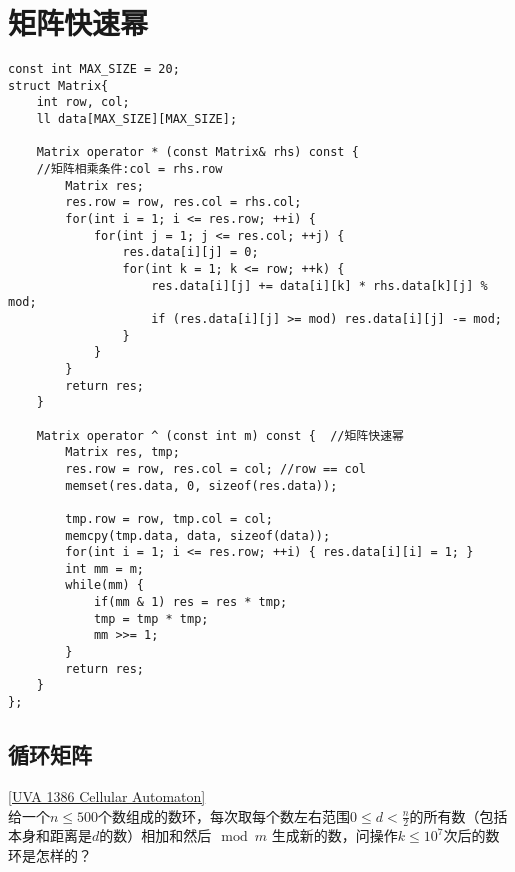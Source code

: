 \section{矩阵快速幂}
\begin{lstlisting}
const int MAX_SIZE = 20;
struct Matrix{
    int row, col;
    ll data[MAX_SIZE][MAX_SIZE];

    Matrix operator * (const Matrix& rhs) const {
    //矩阵相乘条件:col = rhs.row
        Matrix res;
        res.row = row, res.col = rhs.col;
        for(int i = 1; i <= res.row; ++i) {
            for(int j = 1; j <= res.col; ++j) {
                res.data[i][j] = 0;
                for(int k = 1; k <= row; ++k) {
                    res.data[i][j] += data[i][k] * rhs.data[k][j] % mod;
                    if (res.data[i][j] >= mod) res.data[i][j] -= mod;
                }
            }
        }
        return res;
    }

    Matrix operator ^ (const int m) const {  //矩阵快速幂
        Matrix res, tmp;
        res.row = row, res.col = col; //row == col
        memset(res.data, 0, sizeof(res.data));

        tmp.row = row, tmp.col = col;
        memcpy(tmp.data, data, sizeof(data));
        for(int i = 1; i <= res.row; ++i) { res.data[i][i] = 1; }
        int mm = m;
        while(mm) {
            if(mm & 1) res = res * tmp;
            tmp = tmp * tmp;
            mm >>= 1;
        }
        return res;
    }
};
\end{lstlisting}

\subsection{循环矩阵}
\underline{[UVA 1386 Cellular Automaton]} \\

给一个$n\leq 500$个数组成的数环，每次取每个数左右范围$0\leq d< \frac{n}{2}$的所有数（包括本身和距离是$d$的数）相加和然后$\mod m$ 生成新的数，问操作$k\leq 10^7$次后的数环是怎样的？ \\

